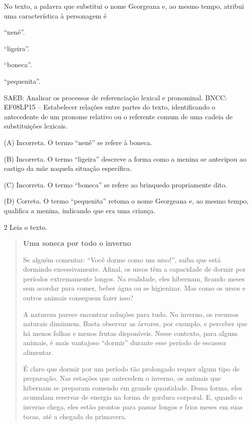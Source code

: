 
No texto, a palavra que substitui o nome Georgeana e, ao mesmo tempo,
atribui uma característica à personagem é

\begin{escolha}
\item ``nenê''.

\item ``ligeira''.

\item ``boneca''.

\item ``pequenita''.
\end{escolha}

SAEB: Analisar os processos de referenciação lexical e pronominal. BNCC:
EF08LP15 -- Estabelecer relações entre partes do texto, identificando o
antecedente de um pronome relativo ou o referente comum de uma cadeia de
substituições lexicais.

(A) Incorreta. O termo ``nenê'' se refere à boneca.

(B) Incorreta. O termo ``ligeira'' descreve a forma como a menina se
antecipou ao castigo da mãe naquela situação específica.

(C) Incorreta. O termo ``boneca'' se refere ao brinquedo propriamente
dito.

(D) Correta. O termo ``pequenita'' retoma o nome Georgeana e, ao mesmo
tempo, qualifica a menina, indicando que era uma criança.

\num{2} Leia o texto.

\begin{quote}
\textbf{Uma soneca por todo o inverno}

Se alguém comentar: ``Você dorme como um urso!'', saiba que está
dormindo excessivamente. Afinal, os ursos têm a capacidade de dormir por
períodos extremamente longos. Na realidade, eles hibernam, ficando meses
sem acordar para comer, beber água ou se higienizar. Mas como os ursos e
outros animais conseguem fazer isso?

A natureza parece encontrar soluções para tudo. No inverno, os recursos
naturais diminuem. Basta observar as árvores, por exemplo, e perceber
que há menos folhas e menos frutas disponíveis. Nesse contexto, para
alguns animais, é mais vantajoso ``dormir'' durante esse período de
escassez alimentar.

É claro que dormir por um período tão prolongado requer algum tipo de
preparação. Nas estações que antecedem o inverno, os animais que
hibernam se preparam comendo em grande quantidade. Dessa forma, eles
acumulam reservas de energia na forma de gordura corporal. E, quando o
inverno chega, eles estão prontos para passar longos e frios meses em
suas tocas, até a chegada da primavera.
\end{quote}

